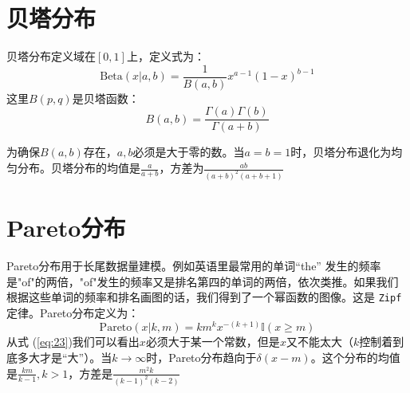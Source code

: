 \documentclass[10pt,a4paper,UTF8]{article}
\begin{document}
\section{贝塔分布}
\label{sec:org85fa2c5}

贝塔分布定义域在\([0,1]\)上，定义式为：
\begin{equation}
\label{eq:21}
\mathrm{Beta}(x|a,b) = \frac{1}{B(a,b)}x^{a-1}(1-x)^{b-1}
\end{equation}
这里\(B(p,q)\)是贝塔函数：
\begin{equation}
\label{eq:22}
B(a,b) = \frac{\Gamma(a)\Gamma(b)}{\Gamma(a+b)}
\end{equation}

为确保\(B(a,b)\)存在，\(a,b\)必须是大于零的数。当\(a=b=1\)时，贝塔分布退化为均匀分布。贝塔分布的均值是\(\frac{a}{a+b}\)，方差为\(\frac{ab}{(a+b)^{2}(a+b+1)}\)
\section{Pareto分布}
\label{sec:org6e545de}


Pareto分布用于长尾数据量建模。例如英语里最常用的单词“the” 发生的频率是"of"的两倍，"of"发生的频率又是排名第四的单词的两倍，依次类推。如果我们根据这些单词的频率和排名画图的话，我们得到了一个幂函数的图像。这是 \texttt{Zipf} 定律。Pareto分布定义为：
\begin{equation}
\label{eq:23}
\mathrm{Pareto}(x|k,m)= km^{k}x^{-(k+1)} \mathbb{I}(x \geq m)
\end{equation}
从式 (\ref{eq:23})我们可以看出\(x\)必须大于某一个常数，但是\(x\)又不能太大（\(k\)控制着到底多大才是“大”）。当\(k\to\infty\)时，Pareto分布趋向于\(\delta(x-m)\)。这个分布的均值是\(\frac{km}{k-1},k  > 1\)，方差是\(\frac{m^{2}k}{(k-1)^{2}(k-2)}\)
\end{document}
